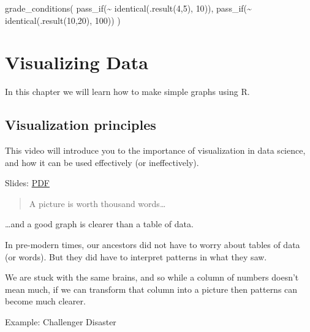 \documentclass[
]{article}
\newenvironment{Shaded}{\begin{snugshade}}{\end{snugshade}}
\newcommand{\DecValTok}[1]{\textcolor[rgb]{0.00,0.00,0.81}{#1}}
\newcommand{\FunctionTok}[1]{\textcolor[rgb]{0.00,0.00,0.00}{#1}}
\newcommand{\NormalTok}[1]{#1}
\newcommand{\SpecialCharTok}[1]{\textcolor[rgb]{0.00,0.00,0.00}{#1}}
\theoremstyle{definition}
\theoremstyle{definition}
\theoremstyle{definition}
\theoremstyle{definition}
\theoremstyle{remark}
\begin{document}
\begin{Shaded}
\begin{Highlighting}[]
\FunctionTok{grade\_conditions}\NormalTok{(}
  \FunctionTok{pass\_if}\NormalTok{(}\SpecialCharTok{\textasciitilde{}} \FunctionTok{identical}\NormalTok{(}\FunctionTok{.result}\NormalTok{(}\DecValTok{4}\NormalTok{,}\DecValTok{5}\NormalTok{), }\DecValTok{10}\NormalTok{)),}
  \FunctionTok{pass\_if}\NormalTok{(}\SpecialCharTok{\textasciitilde{}} \FunctionTok{identical}\NormalTok{(}\FunctionTok{.result}\NormalTok{(}\DecValTok{10}\NormalTok{,}\DecValTok{20}\NormalTok{), }\DecValTok{100}\NormalTok{))}
\NormalTok{)}
\end{Highlighting}
\end{Shaded}

\newpage

\hypertarget{visualizing-data}{%
\section{Visualizing Data}\label{visualizing-data}}

In this chapter we will learn how to make simple graphs using R.

\hypertarget{visualization-principles}{%
\subsection{Visualization principles}\label{visualization-principles}}

This video will introduce you to the importance of visualization in data science, and how it can be used effectively (or ineffectively).

Slides: \href{https://gmuedu-my.sharepoint.com/:b:/g/personal/dwhite34_gmu_edu/ETyT0aRqt6tHspWXcGyumEgBG6K79TUuaN0mWTLsaiOySA?e=KkfEsO}{PDF}

\begin{quote}
A picture is worth thousand words\ldots{}
\end{quote}

\ldots and a good graph is clearer than a table of data.

In pre-modern times, our ancestors did not have to worry about tables of data (or words). But they did have to interpret patterns in what they saw.

We are stuck with the same brains, and so while a column of numbers doesn't mean much, if we can transform that column into a picture then patterns can become much clearer.

Example: Challenger Disaster
\end{document}

